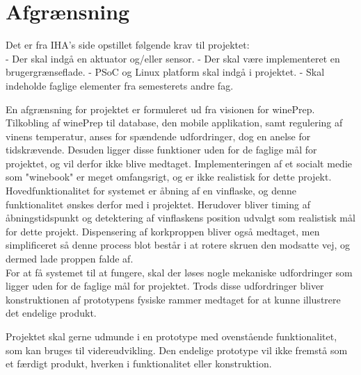 \chapter{Afgrænsning}
Det er fra IHA's side opstillet følgende krav til projektet:\\
- Der skal indgå en aktuator og/eller sensor.
- Der skal være implementeret en brugergrænseflade.
- PSoC og Linux platform skal indgå i projektet.
- Skal indeholde faglige elementer fra semesterets andre fag.

En afgrænsning for projektet er formuleret ud fra visionen for winePrep. Tilkobling af winePrep til database, den mobile applikation, samt regulering af vinens 
temperatur, anses for spændende udfordringer, dog en anelse for tidskrævende. Desuden ligger disse funktioner uden for de faglige mål for projektet, og vil 
derfor ikke blive medtaget. Implementeringen af et socialt medie som "winebook" er meget omfangsrigt, og er ikke realistisk for dette projekt.\\

Hovedfunktionalitet for systemet er åbning af en vinflaske, og denne funktionalitet ønskes derfor med i projektet. Herudover bliver timing af åbningstidspunkt 
og detektering af vinflaskens position udvalgt som realistisk mål for dette projekt. Dispensering af korkproppen bliver også medtaget, men simplificeret så denne
process blot består i at rotere skruen den modsatte vej, og dermed lade proppen falde af.\\

For at få systemet til at fungere, skal der løses nogle mekaniske udfordringer som ligger uden for de faglige mål for projektet. Trods disse udfordringer
bliver konstruktionen af prototypens fysiske rammer medtaget for at kunne illustrere det endelige produkt.

Projektet skal gerne udmunde i en prototype med ovenstående funktionalitet, som kan bruges til videreudvikling. Den endelige prototype vil ikke fremstå som et 
færdigt produkt, hverken i funktionalitet eller konstruktion. 

    